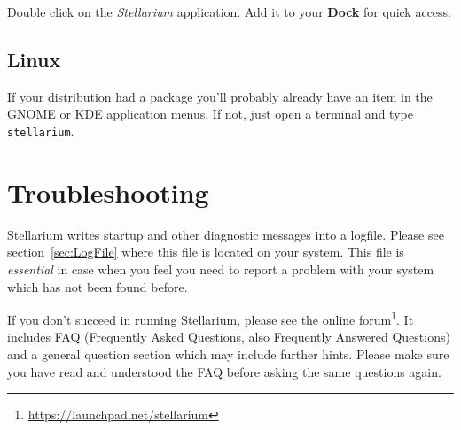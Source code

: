 Double click on the \emph{Stellarium} application.  Add it to your
\textbf{Dock} for quick access.

\subsection{Linux}
\label{sec:GettingStarted:Running:Linux}

If your distribution had a package you'll probably already have an
item in the GNOME or KDE application menus. If not, just open a
terminal and type \texttt{stellarium}.


\section{Troubleshooting}
\label{sec:GettingStarted:Running:Troubleshooting}

Stellarium writes startup and other diagnostic messages into a
logfile. Please see section~\ref{sec:LogFile} where this
file is located on your system. This file is \emph{essential} in case when
you feel you need to report a problem with your system which has not
been found before.

If you don't succeed in running Stellarium, please see the online
forum\footnote{\url{https://launchpad.net/stellarium}}.  It includes
FAQ (Frequently Asked Questions, also Frequently Answered
Questions) and a general question section which may include
further hints. Please make sure you have read and understood the FAQ
before asking the same questions again.



